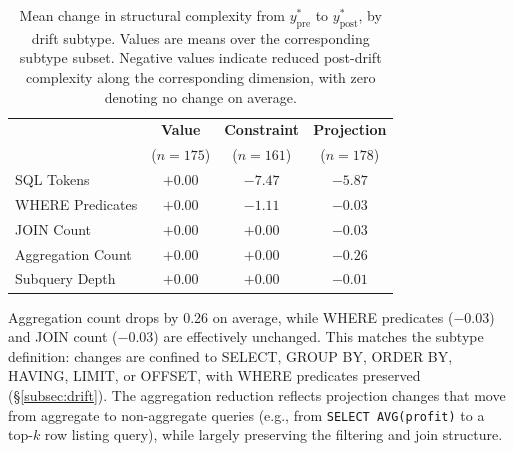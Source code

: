 \begin{table}[t]
\centering
\small
\setlength{\tabcolsep}{4pt}
\renewcommand{\arraystretch}{1.45}
\begin{tabular}{lccc}
\toprule
& \textbf{Value} & \textbf{Constraint} & \textbf{Projection} \\
& ($n{=}175$) & ($n{=}161$) & ($n{=}178$) \\
\midrule
SQL Tokens         & $+0.00$ & $-7.47$ & $-5.87$ \\
WHERE Predicates   & $+0.00$ & $-1.11$ & $-0.03$ \\
JOIN Count         & $+0.00$ & $+0.00$ & $-0.03$ \\
Aggregation Count  & $+0.00$ & $+0.00$ & $-0.26$ \\
Subquery Depth     & $+0.00$ & $+0.00$ & $-0.01$ \\
\bottomrule
\end{tabular}
\vspace{-2mm}
\caption{Mean change in structural complexity from $y_{\mathrm{pre}}^*$ to $y_{\mathrm{post}}^*$, by drift subtype. Values are means over the corresponding subtype subset. Negative values indicate reduced post-drift complexity along the corresponding dimension, with zero denoting no change on average.}
\label{tab:complexity-subtype}
\vspace{-5mm}
\end{table}

 Aggregation count drops by 0.26 on average, while WHERE predicates ($-0.03$) and JOIN count ($-0.03$) are effectively unchanged. This matches the subtype definition: changes are confined to SELECT, GROUP BY, ORDER BY, HAVING, LIMIT, or OFFSET, with WHERE predicates preserved (\S\ref{subsec:drift}). The aggregation reduction reflects projection changes that move from aggregate to non-aggregate queries (e.g., from \texttt{SELECT AVG(profit)} to a top-$k$ row listing query), while largely preserving the filtering and join structure.


